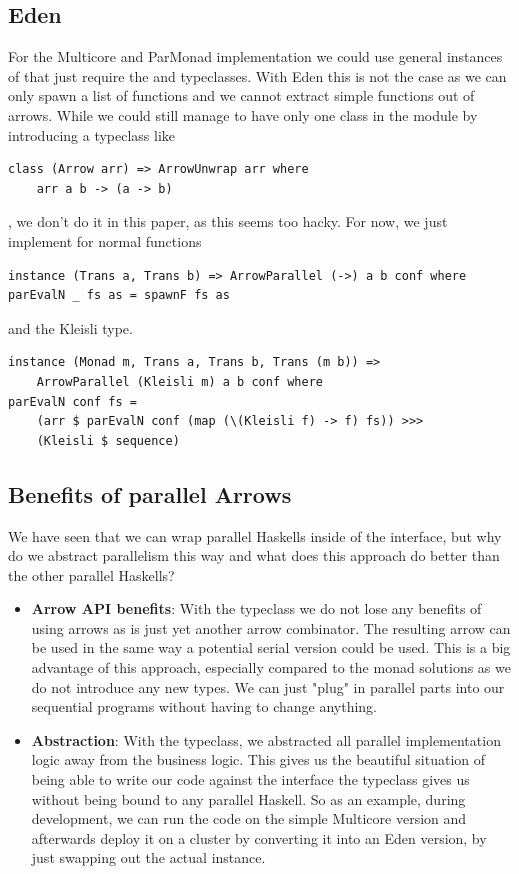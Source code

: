 \subsection{Eden}
For the Multicore and ParMonad implementation we could use general instances of  that just require the  and  typeclasses. With Eden this is not the case as we can only spawn a list of functions and we cannot extract simple functions out of arrows. While we could still manage to have only one class in the module by introducing a typeclass like
\begin{lstlisting}[frame=htrbl]
class (Arrow arr) => ArrowUnwrap arr where
	arr a b -> (a -> b)
\end{lstlisting}
, we don't do it in this paper, as this seems too hacky. For now, we just implement  for normal functions
\begin{lstlisting}[frame=htrbl]
instance (Trans a, Trans b) => ArrowParallel (->) a b conf where
parEvalN _ fs as = spawnF fs as
\end{lstlisting}
and the Kleisli type.
\begin{lstlisting}[frame=htrbl]
instance (Monad m, Trans a, Trans b, Trans (m b)) =>
	ArrowParallel (Kleisli m) a b conf where
parEvalN conf fs =
	(arr $ parEvalN conf (map (\(Kleisli f) -> f) fs)) >>>
	(Kleisli $ sequence)
\end{lstlisting}

\subsection{Benefits of parallel Arrows}
We have seen that we can wrap parallel Haskells inside of the  interface, but why do we abstract parallelism this way and what does this approach do better than the other parallel Haskells?
\begin{itemize}
	\item \textbf{Arrow API benefits}:
	With the  typeclass we do not lose any benefits of using arrows as  is just yet another arrow combinator. The resulting arrow can be used in the same way a potential serial version could be used. This is a big advantage of this approach, especially compared to the monad solutions as we do not introduce any new types. We can just "plug" in parallel parts into our sequential programs without having to change anything.
	\item \textbf{Abstraction}:
	With the  typeclass, we abstracted all parallel implementation logic away from the business logic. This gives us the beautiful situation of being able to write our code against the interface the typeclass gives us without being bound to any parallel Haskell. So as an example, during development, we can run the code on the simple Multicore version and afterwards deploy it on a cluster by converting it into an Eden version, by just swapping out the actual  instance.
\end{itemize}
